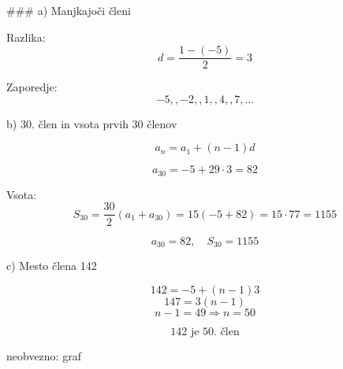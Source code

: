 \documentclass[a4paper,12pt]{letter}
\begin{document}
### a) Manjkajoči členi

Razlika:
$$
d=\frac{1-(-5)}{2}=3
$$

Zaporedje:
$$
-5,,-2,,1,,4,,7,\ldots
$$

b) $30$. člen in vsota prvih $30$ členov

$$
a_n=a_1+(n-1)d
$$

$$
a_{30}=-5+29\cdot3=82
$$

Vsota:
$$
S_{30}=\frac{30}{2}(a_1+a_{30})=15( -5+82)=15\cdot77=1155
$$

$$
\boxed{a_{30}=82,\quad S_{30}=1155}
$$

c) Mesto člena 142

$$
142=-5+(n-1)3
$$
$$
147=3(n-1)
$$
$$
n-1=49 \Rightarrow n=50
$$

$$
\boxed{142 \text{ je } 50.\text{ člen}}
$$

neobvezno: graf
\end{document}
